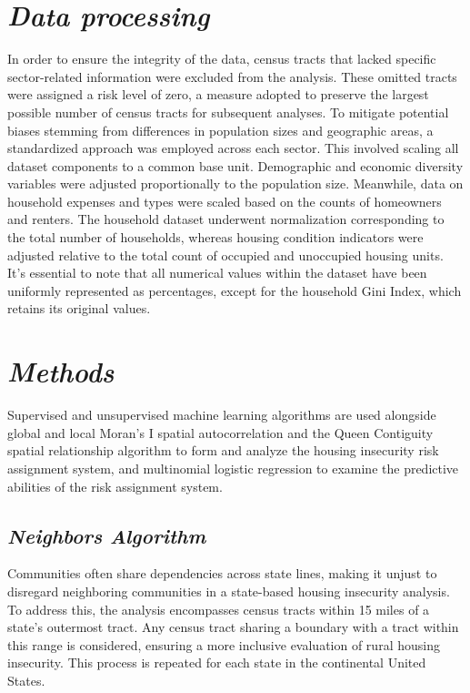 \section{\textit{Data processing}}
In order to ensure the integrity of the data, census tracts that lacked specific sector-related information were excluded from the analysis. These omitted tracts were assigned a risk level of zero, a measure adopted to preserve the largest possible number of census tracts for subsequent analyses. To mitigate potential biases stemming from differences in population sizes and geographic areas, a standardized approach was employed across each sector. This involved scaling all dataset components to a common base unit. Demographic and economic diversity variables were adjusted proportionally to the population size. Meanwhile, data on household expenses and types were scaled based on the counts of homeowners and renters. The household dataset underwent normalization corresponding to the total number of households, whereas housing condition indicators were adjusted relative to the total count of occupied and unoccupied housing units. It's essential to note that all numerical values within the dataset have been uniformly represented as percentages, except for the household Gini Index, which retains its original values. %

\section{\textit{Methods}}
Supervised and unsupervised machine learning algorithms are used alongside global and local Moran's I spatial autocorrelation and the Queen Contiguity spatial relationship algorithm to form and analyze the housing insecurity risk assignment system, and multinomial logistic regression to examine the predictive abilities of the risk assignment system.

\subsection{\textit{Neighbors Algorithm}}
Communities often share dependencies across state lines, making it unjust to disregard neighboring communities in a state-based housing insecurity analysis. To address this, the analysis encompasses census tracts within 15 miles of a state's outermost tract. Any census tract sharing a boundary with a tract within this range is considered, ensuring a more inclusive evaluation of rural housing insecurity. This process is repeated for each state in the continental United States.

